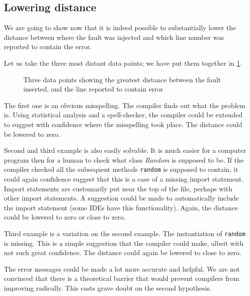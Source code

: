 \documentclass[10pt]{report}
\begin{document}
\subsection{Lowering distance}

We are going to show now that it is indeed possible to substantially lower the distance between where the fault was injected and which line number was reported to contain the error.

Let us take the three most distant data points; we have put them together in \ref{improvabledistance}.

\begin{figure}[p]
    \centering
    \setlength\fboxsep{0pt}
    \setlength\fboxrule{0pt}
    \caption{Three data points showing the greatest distance between the fault inserted, and the line reported to contain error}
    \label{improvabledistance}
\end{figure}

The first one is an obvious misspelling.  The compiler finds out what the problem is.  Using statistical analysis and a spell-checker, the compiler could be extended to suggest with confidence where the misspelling took place.  The distance could be lowered to zero.

Second and third example is also easily solvable.  It is much easier for a computer program then for a human to check what class {\em Random} is supposed to be.  If the compiler checked all the subsequent methods {\tt random} is supposed to contain, it could again confidence suggest that this is a case of a missing import statement.  Import statements are customarily put near the top of the file, perhaps with other import statements.  A suggestion could be made to automatically include the import statement (some IDEs have this functionality).  Again, the distance could be lowered to zero or close to zero.

Third example is a variation on the second example.  The instantiation of {\tt random} is missing.  This is a simple suggestion that the compiler could make, albeit with not such great confidence.  The distance could again be lowered to close to zero.

The error messages could be made a lot more accurate and helpful.  We are not convinced that there is a theoretical barrier that would prevent compilers from improving radically.  This casts grave doubt on the second hypothesis.
\end{document}
